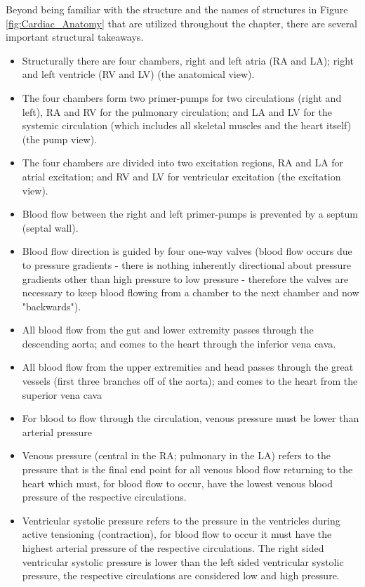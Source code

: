 Beyond being familiar with the structure and the names of structures in Figure \ref{fig:Cardiac_Anatomy} that are utilized throughout the chapter, there are several important structural takeaways.

\begin{itemize}
    \item Structurally there are four chambers, right and left atria (RA and LA); right and left ventricle (RV and LV) (the anatomical view).
    \item The four chambers form two primer-pumps for two circulations (right and left), RA and RV for the pulmonary circulation; and LA and LV for the systemic circulation (which includes all skeletal muscles and the heart itself) (the pump view).
    \item The four chambers are divided into two excitation regions, RA and LA for atrial excitation; and RV and LV for ventricular excitation (the excitation view).
    \item Blood flow between the right and left primer-pumps is prevented by a septum (septal wall).
    \item Blood flow direction is guided by four one-way valves (blood flow occurs due to pressure gradients - there is nothing inherently directional about pressure gradients other than high pressure to low pressure - therefore the valves are necessary to keep blood flowing from a chamber to the next chamber and now "backwards").
    \item All blood flow from the gut and lower extremity passes through the descending aorta; and comes to the heart through the inferior vena cava.
    \item All blood flow from the upper extremities and head passes through the great vessels (first three branches off of the aorta); and comes to the heart from the superior vena cava
    \item For blood to flow through the circulation, venous pressure must be lower than arterial pressure
    \item Venous pressure (central in the RA; pulmonary in the LA) refers to the pressure that is the final end point for all venous blood flow returning to the heart which must, for blood flow to occur, have the lowest venous blood pressure of the respective circulations. 
    \item Ventricular systolic pressure refers to the pressure in the ventricles during active tensioning (contraction), for blood flow to occur it must have the highest arterial pressure of the respective circulations. The right sided ventricular systolic pressure is lower than the left sided ventricular systolic pressure, the respective circulations are considered low and high pressure.

\end{itemize}
